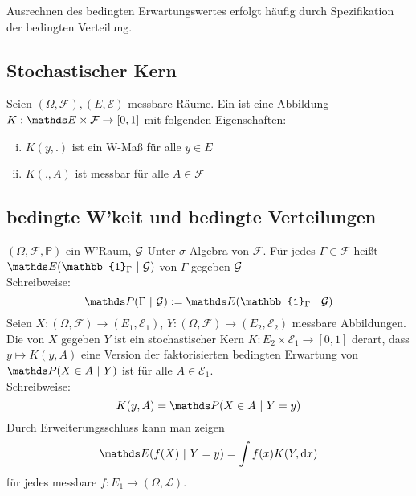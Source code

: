 Ausrechnen des bedingten Erwartungswertes erfolgt häufig durch Spezifikation der bedingten Verteilung.


\subsection{Stochastischer Kern}
\label{sub:stoch_kern}
Seien $(\Omega,\mathcal{F}),(E,\mathcal{E})$ messbare Räume. Ein  ist eine Abbildung $K:\E\times \F \to [0,1]$ mit folgenden Eigenschaften:
\begin{enumerate}[(i)]
	\item $K(y,.)$ ist ein W-Maß für alle $y\in E$
	\item $K(.,A)$ ist messbar für alle $A\in \mathcal{F}$
\end{enumerate}


\subsection{bedingte W'keit und bedingte Verteilungen}
\label{sub:bed_wk_vert}
$(\Omega,\mathcal{F},\mathds{P})$ ein W'Raum, $\mathcal{G}$ Unter-$\sigma$-Algebra von $\mathcal{F}$. Für jedes $\Gamma\in \mathcal{F}$ heißt $\E(\mathbb{1}_\Gamma~|~\G)$  von $\Gamma$ gegeben $\mathcal{G}$\\
Schreibweise: \[\Pw(\Gamma~|~\G):=\E(\mathbb{1}_\Gamma~|~\G) \]
Seien $X:(\Omega,\mathcal{F})\to (E_1,\mathcal{E}_1)$, $Y:(\Omega,\mathcal{F})\to (E_2,\mathcal{E}_2)$ messbare Abbildungen.\\
Die  von $X$ gegeben $Y$ ist ein stochastischer Kern $K:E_2\times \mathcal{E}_1\to [0,1]$ derart, dass $y\mapsto K(y,A)$ eine Version der faktorisierten bedingten Erwartung von $\Pw(X\in A~|~Y)$ ist für alle $A\in\mathcal{E}_1$.\\
Schreibweise: \[K(y,A)=\Pw(X\in A~|~Y=y) \]
Durch Erweiterungsschluss kann man zeigen \[\E(f(X)~|~Y=y)= \int f(x) K(Y,\dint x) \]
für jedes messbare $f:E_1\to(\Omega,\mathcal{L})$.

